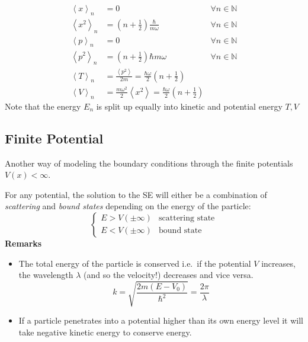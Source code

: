 \noindent\begin{align*}
    \left\langle x \right\rangle _n   & = 0                                                                                                    & \forall n \in \mathbb{N} \\
    \left\langle x^2 \right\rangle _n & = \left(n+\frac{1}{2}\right)\frac{\hbar}{m\omega}                                                      & \forall n \in \mathbb{N} \\
    \left\langle p \right\rangle _n   & = 0                                                                                                    & \forall n \in \mathbb{N} \\
    \left\langle p^2 \right\rangle _n & = \left(n+\frac{1}{2}\right)\hbar m\omega                                                              & \forall n \in \mathbb{N} \\
    \left\langle T \right\rangle _n   & = \frac{\left\langle p^2 \right\rangle}{2m} =  \frac{\hbar \omega}{2}\left(n+\frac{1}{2}\right)                                   \\
    \left\langle V \right\rangle _n   & = \frac{m\omega^2}{2}\left\langle x^2 \right\rangle = \frac{\hbar \omega}{2}\left(n+\frac{1}{2}\right)
\end{align*}
Note that the energy $E_n$ is split up equally into kinetic and potential energy $T,V$

\subsection{Finite Potential}
Another way of modeling the boundary conditions through the finite potentials $V(x) < \infty$.

For any potential, the solution to the SE will either be a combination of \textit{scattering} and \textit{bound states} depending on the energy of the particle:
\noindent\begin{equation*}
    \begin{cases}
        E > V(\pm \infty) & \text{scattering state} \\
        E < V(\pm \infty) & \text{bound state}
    \end{cases}
\end{equation*}
\textbf{Remarks}

\begin{itemize}
    \item The total energy of the particle is conserved i.e.\ if the potential $V$ increases, the wavelength $\lambda$ (and so the velocity!) decreases and vice versa.
          \noindent\begin{equation*}
              k=\sqrt{\frac{2m(E-V_0)}{\hbar^2}} = \frac{2\pi}{\lambda}
          \end{equation*}
    \item If a particle penetrates into a potential higher than its own energy level it will take negative kinetic energy to conserve energy.
\end{itemize}

